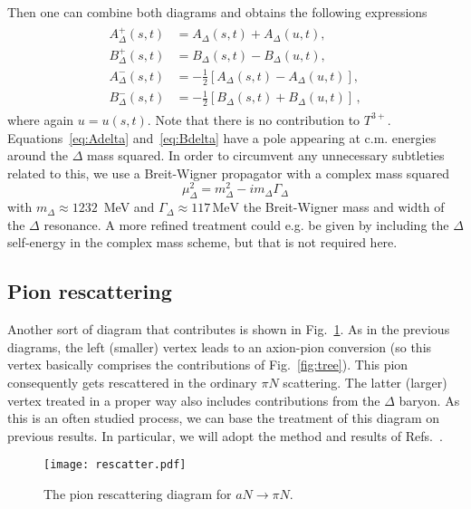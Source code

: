 \documentclass[reprint,amssymb,amsmath,floatfix,aps,prd,groupedaddress,nofootinbib]{revtex4-2}
\begin{document}
Then one can combine both diagrams and obtains the following expressions 
\begin{align}
\begin{split}
A_\Delta^+ (s,t) & = A_\Delta (s,t) + A_\Delta (u,t), \\ B_\Delta^+ (s,t)& = B_\Delta (s,t) - B_\Delta (u,t),  \\
A_\Delta^- (s,t)& = -\frac{1}{2} \left[ A_\Delta (s,t) - A_\Delta (u,t) \right], \\ B_\Delta^- (s,t)&
= -\frac{1}{2} \left[B_\Delta (s,t) + B_\Delta (u,t)\right]\,,
\end{split}
\end{align}
where again $u = u(s,t)$. Note that there is no contribution to $T^{3+}$. Equations~\eqref{eq:Adelta}
and~\eqref{eq:Bdelta} have a pole appearing at c.m. energies around the $\Delta$ mass squared.
In order to circumvent any unnecessary subtleties related to 
this, we use a Breit-Wigner propagator with a complex mass squared
\begin{equation}
\mu_\Delta^2 = m_\Delta^2 - i m_\Delta \Gamma_\Delta
\end{equation} 
with $m_\Delta\approx1232$~MeV and $\Gamma_\Delta\approx 117\,\text{MeV}$  the Breit-Wigner mass and width of the $\Delta$ resonance.
A more refined treatment could e.g. be given by including the $\Delta$ self-energy in the complex mass scheme, but that is not required here.

\subsection{Pion rescattering}

Another sort of diagram that contributes is shown in Fig.~\ref{fig:rescatter}. As in the previous diagrams,
the left (smaller) vertex leads to an axion-pion conversion (so this vertex basically comprises the
contributions of Fig.~\ref{fig:tree}). This pion consequently gets rescattered in the ordinary $\pi N$ scattering.
The latter (larger) vertex treated in a proper way also includes contributions from the $\Delta$ baryon.
As this is an often studied process, we can base the treatment of this diagram on previous results.
In particular, we will adopt the method and results of Refs.~\cite{Meissner:1999vr,Oller:2000fj}.
\begin{figure}
\centering
\texttt{[image: rescatter.pdf]}
\caption{The pion rescattering diagram for $aN\to \pi N$.}
\label{fig:rescatter}
\end{figure}
\end{document}
